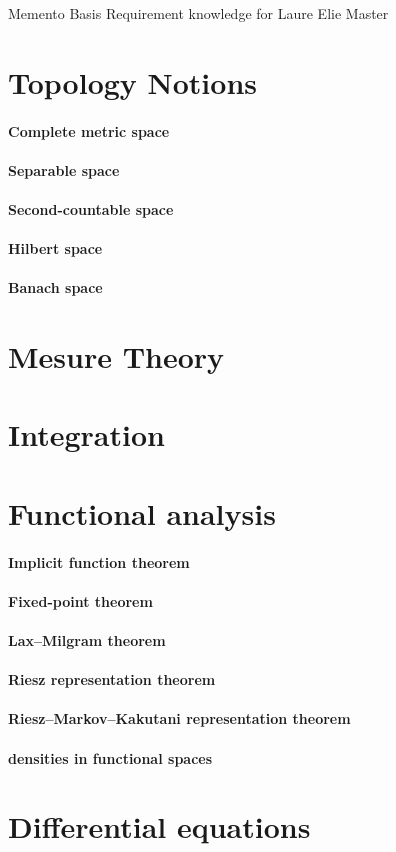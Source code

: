 \documentclass[a4paper,10pt]{article}
\begin{document}
\begin{center}Memento Basis Requirement knowledge for Laure Elie Master\end{center}
\section{Topology Notions}
\paragraph{Complete metric space}
\paragraph{Separable space}
\paragraph{Second-countable space}
\paragraph{Hilbert space}
\paragraph{Banach space}

\section{Mesure Theory}

\section{Integration}

\section{Functional analysis}
\paragraph{Implicit function theorem}
\paragraph{Fixed-point theorem}
\paragraph{Lax–Milgram theorem}
\paragraph{Riesz representation theorem}
\paragraph{Riesz–Markov–Kakutani representation theorem}
\paragraph{densities in functional spaces}

\section{Differential equations}
\end{document}
